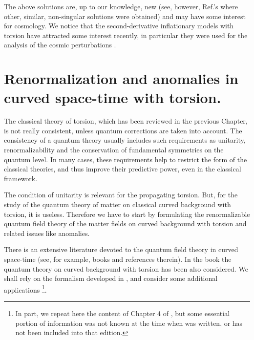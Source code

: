 The above solutions are, up to our knowledge, new 
(see, however, Ref.'s \cite{s1,s2,s3} where other,
similar, non-singular solutions were obtained) and
may have some interest for cosmology. 
We notice that the second-derivative inflationary models 
with torsion have attracted some interest recently,
in particular they were used for the analysis of 
the cosmic perturbations \cite{palle,garcia}.

\vskip 10mm
\chapter{Renormalization and anomalies in curved space-time 
with torsion.}

The classical theory of torsion, which has been reviewed 
in the previous Chapter, is not really consistent, unless 
quantum corrections are taken into account. 
The consistency of a quantum theory usually 
includes such requirements as unitarity, renormalizability
and the conservation of fundamental symmetries on the 
quantum level. In many cases, these requirements help to 
restrict the form of the classical theories, and thus improve 
their predictive power, even in the classical framework. 

The condition of unitarity is relevant for the  
propagating torsion. But, for the
study of the quantum theory of matter on classical 
curved background with torsion, it is useless.
Therefore we have to start by formulating the 
renormalizable quantum field theory of the matter fields 
on curved background with torsion and related issues
like anomalies.

There is an extensive literature devoted to the quantum 
field theory in curved space-time (see, for example,  books
\cite{birdav,grmamo,fulling,book} and references therein). 
In the book \cite{book} the quantum theory on curved 
background with torsion has been also considered. We shall 
rely on the formalism developed in 
\cite{bush1,thesis,bush-Izv,sh-alexeev,bosh-pot,buodsh,book,anhesh},
and consider some additional applications
\footnote{In part,
we repeat here the content of Chapter 4 of \cite{book}, but some
essential portion of information was not known at the time when 
\cite{book} was written, or has not been included into that 
edition.}. 


